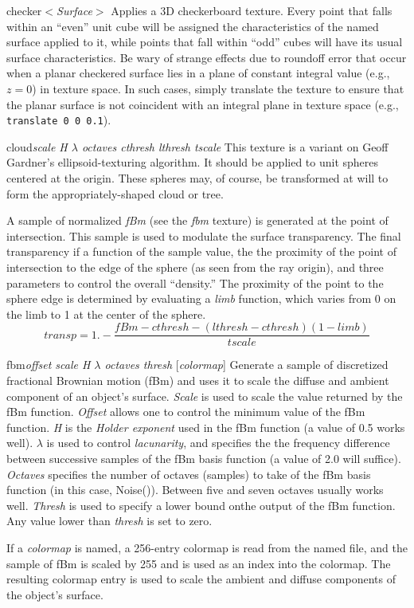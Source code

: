 \begin{defkey}{checker}{$<${\em Surface}$>$}
Applies a 3D checkerboard texture.  Every point that falls within an
``even'' unit cube will be assigned the characteristics of the named surface
applied to it, while points that fall within ``odd'' cubes will have
its usual surface characteristics.  Be wary of strange effects due
to roundoff error that occur when a planar checkered surface lies
in a plane of constant integral value (e.g., $z=0$) in texture space.
In such cases,
simply translate the texture to ensure that the planar surface is not
coincident with an integral plane in texture space
(e.g., {\tt translate 0 0 0.1}).
\end{defkey}

\begin{defkey}{cloud}{{\em scale H $\lambda$ octaves cthresh lthresh tscale}}
	This texture is a variant on Geoff Gardner's ellipsoid-texturing
	algorithm.  It should be applied to unit spheres centered
	at the origin.  These spheres may, of course, be transformed
	at will to form the appropriately-shaped cloud or tree.

	A sample of normalized {\em fBm} (see the {\em fbm} texture) is
	generated
	at the point of intersection.  This sample is used to
	modulate the surface transparency.  The final transparency
	if a function of the sample value, the
	the proximity of the point of intersection to the edge of
	the sphere (as seen from the ray origin), and three parameters
	to control the overall ``density.''  The proximity of the point
	to the sphere edge is determined by evaluating a {\em limb} function,
	which varies from 0 on the limb to 1 at the center of the sphere.
\[
transp = 1. - \frac{fBm - cthresh - (lthresh - cthresh)(1 - limb)}{tscale}
\]
\end{defkey}

\begin{defkey}{fbm}{{\em offset scale H $\lambda$ octaves thresh}
[{\em colormap}]}
Generate a sample of discretized fractional Brownian motion (fBm) and
uses it to scale the diffuse and ambient component of an object's surface.
{\em Scale} is used to scale the value
returned by the fBm function.  {\em Offset} allows one to control the minimum
value of the fBm function.  {\em H} is the {\em Holder exponent}
used in the fBm function (a value of 0.5 works well).  $\lambda$ is
used to control {\em lacunarity}, and specifies the the frequency
difference between successive samples of the fBm basis function (a
value of 2.0 will suffice).  {\em Octaves} specifies the number of
octaves (samples) to take of the fBm basis function (in this case, Noise()).
Between five and seven octaves usually works well.  {\em Thresh} is used
to specify a lower bound onthe output of the fBm function.  Any
value lower than {\em thresh} is set to zero.

If a {\em colormap} is named, a 256-entry colormap is read from the named
file, and the sample of fBm is scaled by 255 and is used as an index into
the colormap.  The resulting colormap entry
is used to scale the ambient and diffuse components of the
object's surface.
\end{defkey}

